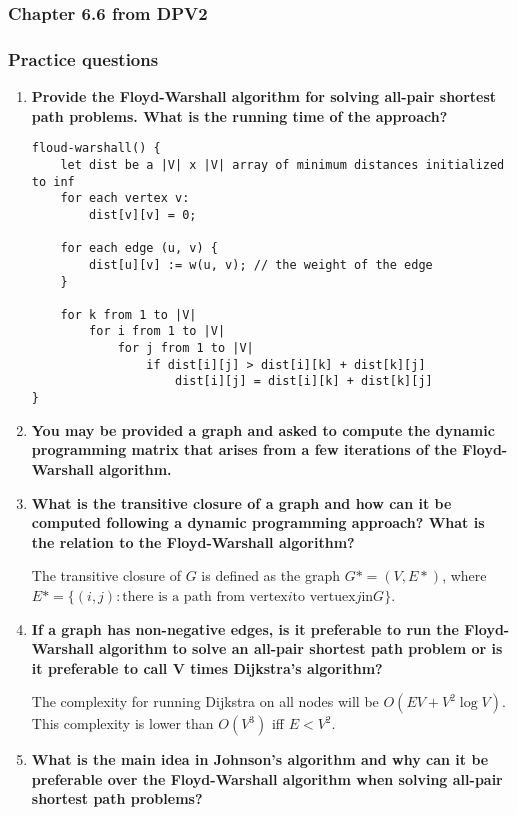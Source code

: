 \documentclass[a4paper,11pt]{article}
\begin{document}
\subsubsection{Chapter 6.6 from DPV2}\label{chapter-6.6-from-dpv2}

\subsubsection{Practice questions}\label{practice-questions-16}

\begin{enumerate}
\def\labelenumi{\arabic{enumi}.}
\item
  \textbf{Provide the Floyd-Warshall algorithm for solving all-pair
  shortest path problems. What is the running time of the approach?}

\begin{verbatim}
floud-warshall() {
    let dist be a |V| x |V| array of minimum distances initialized to inf
    for each vertex v:
        dist[v][v] = 0;

    for each edge (u, v) {
        dist[u][v] := w(u, v); // the weight of the edge
    }

    for k from 1 to |V|
        for i from 1 to |V|
            for j from 1 to |V|
                if dist[i][j] > dist[i][k] + dist[k][j]
                    dist[i][j] = dist[i][k] + dist[k][j]
}
\end{verbatim}
\item
  \textbf{You may be provided a graph and asked to compute the dynamic
  programming matrix that arises from a few iterations of the
  Floyd-Warshall algorithm.}
\item
  \textbf{What is the transitive closure of a graph and how can it be
  computed following a dynamic programming approach? What is the
  relation to the Floyd-Warshall algorithm?}

  The transitive closure of $G$ is defined as the graph
  $G * = (V, E *)$, where
  $E* = \lbrace(i, j) : \text{there is a path from vertex} i \text{to vertuex} j \text{in} G \rbrace$.
\item
  \textbf{If a graph has non-negative edges, is it preferable to run the
  Floyd-Warshall algorithm to solve an all-pair shortest path problem or
  is it preferable to call \textbar{}V\textbar{} times Dijkstra's
  algorithm?}

  The complexity for running Dijkstra on all nodes will be
  $O(EV + V^2 \log V)$. This complexity is lower than $O(V^3)$ iff
  $E < V^2$.
\item
  \textbf{What is the main idea in Johnson's algorithm and why can it be
  preferable over the Floyd-Warshall algorithm when solving all-pair
  shortest path problems?}


\end{enumerate}
\end{document}
